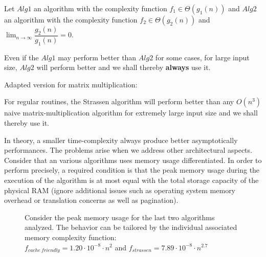 \begin{pitfall}
Let $Alg1$ an algorithm with the complexity function $f_{1} \in \Theta(g_1(n))$  and $Alg2$ an algorithm with the complexity function $f_{2} \in \Theta(g_2(n))$ and $\lim_{n\to\infty} \dfrac{g_2(n)}{g_1(n)} = 0$.

Even if the $Alg1$ may perform better than $Alg2$ for some cases, for large input size, $Alg2$ will perform better and we shall thereby \textbf{always} use it.
\end{pitfall}

\begin{pitfall}
Adapted version for matrix multiplication:

For regular routines, the Strassen algorithm will perform better than any $O(n^3)$ naive matrix-multiplication algorithm for extremely large input size and we shall thereby use it.
\end{pitfall}

In theory, a smaller time-complexity always produce better asymptotically performances. The problems arise when we address other architectural aspects. Consider that an various algorithms uses memory usage differentiated. In order to perform precisely, a required condition is that the peak memory usage during the execution of the algorithm is at most equal with the total storage capacity of the physical RAM (ignore additional issues such as operating system memory overhead or translation concerns as well as pagination).


\begin{figure}[H]
\caption{ Consider the peak memory usage for the last two algorithms analyzed. The behavior can be tailored by the individual associated memory complexity function: \\ $f_{cache\ friendly} = 1.20 \cdot 10^{-8} \cdot n^2 $ and  $f_{strassen} = 7.89 \cdot 10^{-8} \cdot n^{2.7} $ }
\end{figure}

